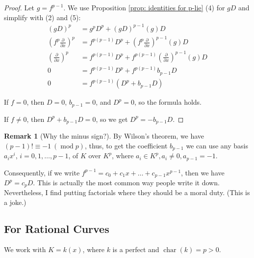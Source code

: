 \documentclass{amsart}
\newcommand{\op}{\operatorname}
\theoremstyle{definition}
\newtheorem{remark}[thm]{Remark}
\begin{document}
\begin{proof}
    Let $g=f^{p-1}$. We use Proposition \ref{prop: identities for p-lie} (4) for $gD$ and simplify with (2) and (5):
    \begin{align*}
        (gD)^p&=g^pD^p+(gD)^{p-1}(g)D\\
        (f^p\frac{\partial}{\partial x})^p&=f^{p(p-1)}D^p+(f^p\frac{\partial}{\partial x})^{p-1}(g)D\\
        (\frac{\partial}{\partial x})^p&=f^{p(p-1)}D^p+f^{p(p-1)}(\frac{\partial}{\partial x})^{p-1}(g)D\\
        0&=f^{p(p-1)}D^p+f^{p(p-1)}b_{p-1}D\\
        0&=f^{p(p-1)}(D^p+b_{p-1}D)
    \end{align*}
    
If $f=0$, then $D=0$, $b_{p-1}=0$, and $D^p=0$, so the formula holds. 

If $f\ne 0$, then $D^p+b_{p-1}D=0$, so we get $D^p=-b_{p-1}D$.
\end{proof}
\begin{remark}[Why the minus sign?]
    By Wilson's theorem, we have $(p-1)!\equiv -1 \ (\op{mod} p)$, thus, to get the coefficient $b_{p-1}$ we can use any basis $a_ix^i$, $i=0,1,\ldots,p-1$, of $K$ over $K^p$, where $a_i\in K^p, a_i\ne 0, a_{p-1}=-1$. 
    
    Consequently, if we write $f^{p-1}=c_0+c_1x+\ldots+c_{p-1}x^{p-1}$, then we have $D^p=c_pD$. This is actually the most common way people write it down. Nevertheless, I find putting factorials where they should be a moral duty. (This is a joke.)
\end{remark}

\subsection{For Rational Curves} We work with $K=k(x)$, where $k$ is a perfect and $\op{char}(k)=p>0$.
\end{document}
